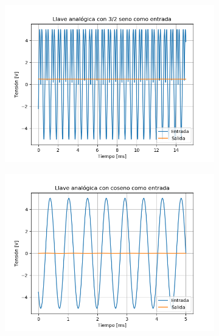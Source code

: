 \begin{figure}[H]
	\begin{subfigure}{.5\textwidth}
	\centering
	\includegraphics[width=\textwidth]{ImagenesEjercicio6/puntob2/LA - 3 2.png}
	\end{subfigure}	
	\begin{subfigure}{.5\textwidth}
	\centering
	\includegraphics[width=\textwidth]{ImagenesEjercicio6/puntob2/LA - Cos.png}
	\end{subfigure}
	

\end{figure}
